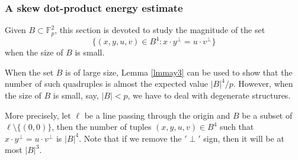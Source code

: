 \documentclass[11pt]{article}
\newtheorem{theorem}{Theorem}[section]
\def\Fbb{\mathbb{F}}
\def\SL{SL}
\def\l({\left(}
\def\r){\right)}
\def\lv{\left\vert}
\def\rv{\right\vert}
\def\lo{\left\{}
\def\ro{\right\}}
\begin{document}
    




\subsubsection*{A skew dot-product energy estimate}
Given $B\subset \mathbb{F}_p^2$, this section is devoted to study the magnitude of the set 
\begin{equation}\label{ene-B}\{(x, y, u, v)\in B^4\colon x\cdot y^\perp=u\cdot v^\perp\}\end{equation}
when the size of $B$ is small. 

When the set $B$ is of large size, Lemma \ref{lmmay3} can be used to show that the number of such quadruples is almost the expected value $|B|^4/p$. However, when the size of $B$ is small, say, $|B|<p$, we have to deal with degenerate structures. 

More precisely, let $\ell$ be a line passing through the origin and $B$ be a subset of $\ell\setminus \{(0, 0)\}$, then the number of tuples $(x,y,u,v) \in B^4 $ such that $x\cdot y^\perp =u\cdot v^\perp $ is $\lv B\rv^4$. Note that if we remove the $'\perp'$ sign, then it will be at most $|B|^3$. 
\end{document}
